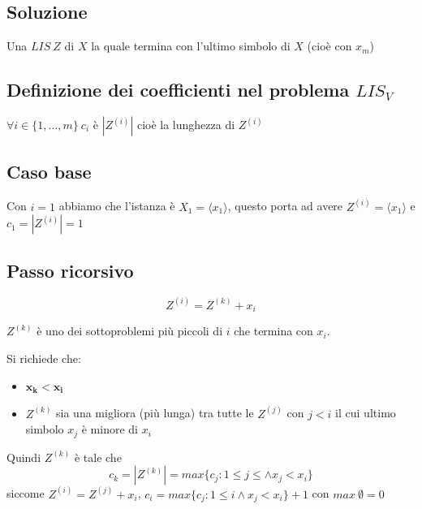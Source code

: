 \subsection{Soluzione}
Una $LIS\ Z$ di $X$ la quale termina con l'ultimo simbolo di $X$ (cioè con $x_m$)

\subsection{Definizione dei coefficienti nel problema $LIS_V$}
$\forall i \in \{1, \dots, m\}\ c_i$ è $|Z^{(i)}|$ cioè la lunghezza di $Z^{(i)}$

\subsection{Caso base}
Con $i=1$ abbiamo che l'istanza è $X_1 =\langle x_1 \rangle$, questo porta ad avere $Z^{(i)}=\langle x_1 \rangle$ e $c_1  = |Z^{(i)}| = 1$

\subsection{Passo ricorsivo}
{
    \large $$ Z^{(i) }= Z^{(k)} + x_i $$ 
}

$Z^(k)$ è uno dei sottoproblemi più piccoli di $i$ che termina con $x_i$.

Si richiede che:
\begin{itemize}
    \item $\mathbf{x_k < x_i}$
    \item $Z^{(k)}$ sia una migliora (più lunga) tra tutte le $Z^{(j)}$ con $j<i$ il cui ultimo simbolo $x_j$ è minore di $x_i$
\end{itemize}

Quindi $Z^{(k)}$ è tale che
{
    \large
    $$ 
        c_k=|Z^{(k)}| = max\{c_j: 1 \leq j \leq \land x_j < x_i\}
    $$
}
siccome $Z^{(i)}=Z^{(j)} + x_i$, $c_i = max\{c_j : 1 \leq i \land x_j < x_i\} + 1$ con $max\ \emptyset=0$

\newpage
